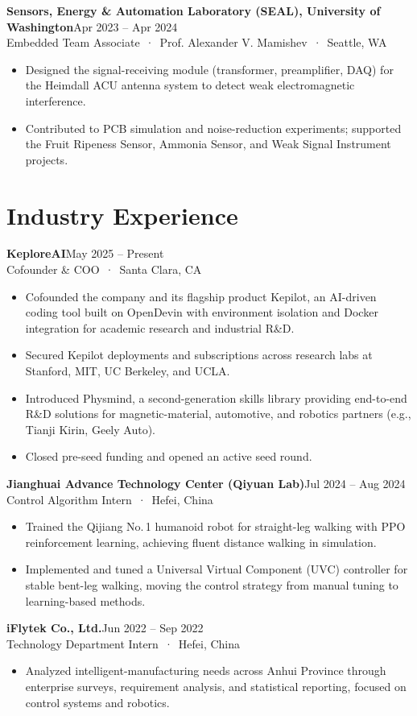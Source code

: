 \documentclass[10pt,letterpaper]{article}
\newcommand{\entry}[4]{\noindent\textbf{#1}\hfill {\color{muted}\small #2}\\ {\color{muted}#3 \,·\, #4}}
\begin{document}
\entry{Sensors, Energy \& Automation Laboratory (SEAL), University of Washington}{Apr 2023 -- Apr 2024}{Embedded Team Associate \,·\, Prof. Alexander V. Mamishev}{Seattle, WA}
\begin{itemize}
\item Designed the signal-receiving module (transformer, preamplifier, DAQ) for the Heimdall ACU antenna system to detect weak electromagnetic interference.
\item Contributed to PCB simulation and noise-reduction experiments; supported the Fruit Ripeness Sensor, Ammonia Sensor, and Weak Signal Instrument projects.
\end{itemize}

\section{Industry Experience}
\entry{KeploreAI}{May 2025 -- Present}{Cofounder \& COO}{Santa Clara, CA}
\begin{itemize}
\item Cofounded the company and its flagship product Kepilot, an AI-driven coding tool built on OpenDevin with environment isolation and Docker integration for academic research and industrial R\&D.
\item Secured Kepilot deployments and subscriptions across research labs at Stanford, MIT, UC Berkeley, and UCLA.
\item Introduced Physmind, a second-generation skills library providing end-to-end R\&D solutions for magnetic-material, automotive, and robotics partners (e.g., Tianji Kirin, Geely Auto).
\item Closed pre-seed funding and opened an active seed round.
\end{itemize}

\entry{Jianghuai Advance Technology Center (Qiyuan Lab)}{Jul 2024 -- Aug 2024}{Control Algorithm Intern}{Hefei, China}
\begin{itemize}
\item Trained the Qijiang No.\,1 humanoid robot for straight-leg walking with PPO reinforcement learning, achieving fluent distance walking in simulation.
\item Implemented and tuned a Universal Virtual Component (UVC) controller for stable bent-leg walking, moving the control strategy from manual tuning to learning-based methods.
\end{itemize}

\entry{iFlytek Co., Ltd.}{Jun 2022 -- Sep 2022}{Technology Department Intern}{Hefei, China}
\begin{itemize}
\item Analyzed intelligent-manufacturing needs across Anhui Province through enterprise surveys, requirement analysis, and statistical reporting, focused on control systems and robotics.
\end{itemize}
\end{document}
